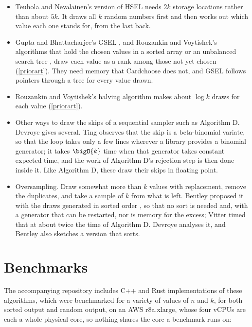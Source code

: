 \documentclass[letterpaper,11pt]{article}
\begin{document}
\begin{itemize}
beyond the output. The packing is intricate, and in its authors' own
timings it takes two to three times as long as their other hash-based
algorithm until \(k\) exceeds \(n/2\) \cite[Figure 4]{teuhola}.
\item Teuhola and Nevalainen's version of HSEL \cite{teuhola} needs
\(2k\) storage locations rather than about \(5k\). It draws all \(k\)
random numbers first and then works out which value each one stands
for, from the last back.
\item Gupta and Bhattacharjee's GSEL \cite{gupta}, and Rouzankin and
Voytishek's algorithms that hold the chosen values in a sorted array
or an unbalanced search tree \cite{RouzankinVoytishek}, draw each
value as a rank among those not yet chosen (\autoref{priorart}). They
need memory that Cardchoose does not, and GSEL follows pointers
through a tree for every value drawn.
\item Rouzankin and Voytishek's halving algorithm
\cite{RouzankinVoytishek} makes about \(\log k\) draws for each value
(\autoref{priorart}).
\item Other ways to draw the skips of a sequential sampler such as
Algorithm D. Devroye \cite[Chapter XII \S 3]{devroye} gives
several. Ting \cite{ting} observes that the
skip is a beta-binomial variate, so that the loop takes only a few
lines wherever a library provides a binomial generator; it takes
\(\bigO{k}\) time when that generator takes constant expected time,
and the work of Algorithm D's rejection step is then done inside it.
Like Algorithm D, these draw their skips in floating point.
\item Oversampling. Draw somewhat more than \(k\) values with
replacement, remove the duplicates, and take a sample of \(k\) from
what is left. Bentley proposed it with the draws generated in sorted
order \cite{bentleysaxe}, so that no sort is needed and, with a
generator that can be restarted, nor is memory for the excess; Vitter
\cite[\S 8]{vitterfaster} timed that at about twice the time of
Algorithm D. Devroye \cite[Chapter XII \S 4]{devroye} analyses it, and
Bentley \cite[\S 12.3]{pearls} also sketches a version that sorts.
\end{itemize}

\section{Benchmarks}\label{benchmarks}

The accompanying repository includes C++ and Rust
implementations of these algorithms, which were benchmarked for a
variety of values of \(n\) and \(k\), for both sorted output and
random output, on an AWS r8a.xlarge, whose four vCPUs are each a whole
physical core, so nothing shares the core a benchmark runs on:
\end{document}
